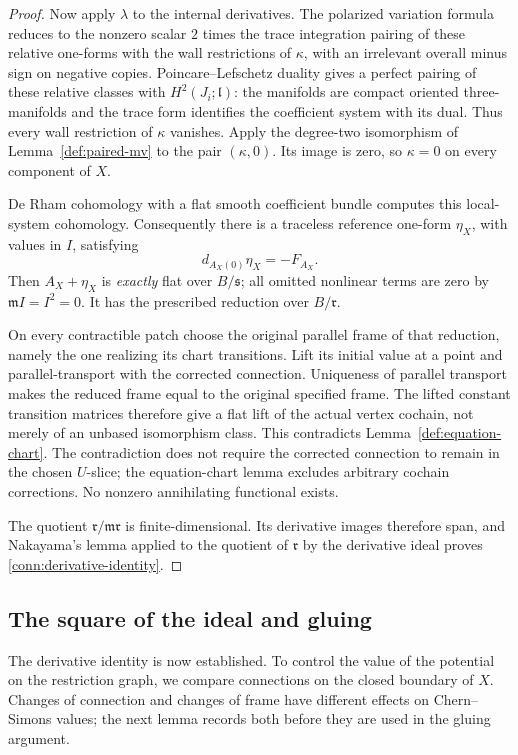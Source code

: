 \begin{proof}
Now apply \(\lambda\) to the internal derivatives.
The polarized variation formula reduces to the
nonzero scalar \(2\) times the trace integration pairing
of these relative one-forms with the wall restrictions
of \(\kappa\), with an irrelevant overall minus sign
on negative copies.  Poincare--Lefschetz duality
\cite[Theorem~3.43]{Hatcher2002} gives
a perfect pairing of these relative classes with
\(H^2(J_i;\mathfrak l)\): the manifolds are compact
oriented three-manifolds and the trace form identifies
the coefficient system with its dual.  Thus every wall
restriction of \(\kappa\) vanishes.
Apply the degree-two isomorphism of
Lemma~\ref{def:paired-mv} to the pair \((\kappa,0)\).
Its image is zero, so \(\kappa=0\) on every component
of \(X\).

De Rham cohomology with a flat smooth coefficient bundle
computes this local-system cohomology.  Consequently
there is a traceless reference one-form \(\eta_X\),
with values in \(I\), satisfying
\[
 d_{A_X(0)}\eta_X=-F_{A_X}.
\]
Then \(A_X+\eta_X\) is \emph{exactly} flat over
\(B/\mathfrak s\); all omitted nonlinear terms are zero
by \(\mathfrak mI=I^2=0\).  It has the prescribed
reduction over \(B/\mathfrak r\).

On every contractible patch choose the original parallel
frame of that reduction, namely the one realizing its
chart transitions.  Lift its initial value at a point
and parallel-transport with the corrected connection.
Uniqueness of parallel transport makes the reduced frame
equal to the original specified frame.  The lifted
constant transition matrices therefore give a flat lift
of the actual vertex cochain, not merely of an unbased
isomorphism class.  This contradicts
Lemma~\ref{def:equation-chart}.  The contradiction does
not require the corrected connection to remain in the
chosen \(U\)-slice; the equation-chart lemma excludes
arbitrary cochain corrections.  No nonzero annihilating
functional exists.

The quotient \(\mathfrak r/\mathfrak m\mathfrak r\)
is finite-dimensional.  Its derivative images therefore
span, and Nakayama's lemma applied to the quotient of
\(\mathfrak r\) by the derivative ideal proves
\eqref{conn:derivative-identity}.
\end{proof}

\subsection{The square of the ideal and gluing}

The derivative identity is now established. To control the value of
the potential on the restriction graph, we compare connections on the
closed boundary of $X$. Changes of connection and changes of frame
have different effects on Chern--Simons values; the next lemma records
both before they are used in the gluing argument.

